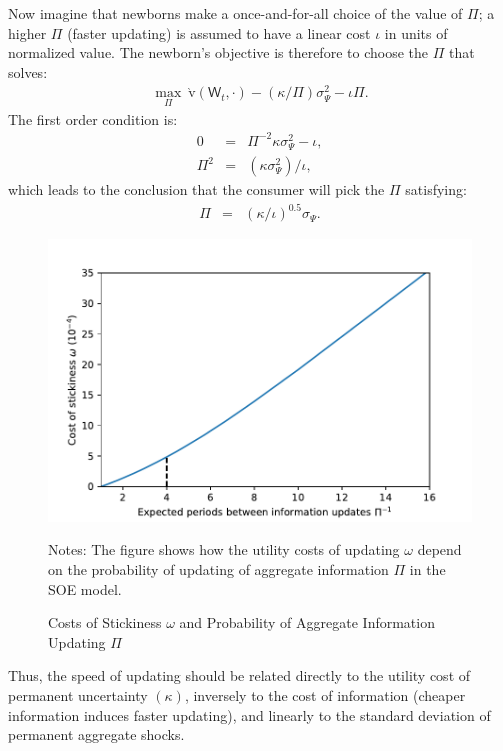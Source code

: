 \documentclass[titlepage]{article}
\begin{document}
Now imagine that newborns make a once-and-for-all choice of the value of $\Pi$; a higher $\Pi$ (faster updating) is assumed to have a linear cost $\iota$ in units of normalized value. The newborn's objective is therefore to choose the $\Pi$ that solves:
\begin{eqnarray*}
   \max_{\Pi} ~ \grave{\mathrm{v}}(\mathsf{W}_t,\cdot)-(\kappa/\Pi)\sigma^{2}_{\Psi}-\iota\Pi. \label{eq:pickPi}
\end{eqnarray*}
 The first order condition is:
\begin{eqnarray*}
     0 & = & \Pi^{-2}\kappa\sigma^{2}_{\Psi}-\iota,
\\  \Pi^{2} & = & (\kappa \sigma^{2}_{\Psi})/\iota,
\end{eqnarray*}
which leads to the conclusion that the consumer will
pick the $\Pi$ satisfying:
\begin{eqnarray*}
  \Pi & = &  (\kappa/\iota)^{0.5} \sigma_{\Psi}. \label{eq:bestPi}
\end{eqnarray*}
 

\begin{figure}
  \centering
\caption{Costs of Stickiness $\omega$ and Probability of Aggregate Information Updating $\Pi$}
\label{costOfStickiness}
{ \includegraphics[width=1.0\textwidth]{./Figures/uCostvsPiInv}}

\footnotesize Notes: The figure shows how the utility costs of updating $\omega$ depend on the probability of updating of aggregate information $\Pi$ in the SOE model.
\end{figure}

Thus, the speed of updating should be related directly to the utility cost of permanent uncertainty $(\kappa)$, inversely to the cost of information (cheaper information induces faster updating), and linearly to the standard deviation of permanent aggregate shocks.
\end{document}
